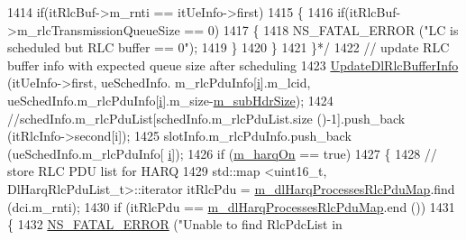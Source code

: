 \begin{DoxyCode}
1414 \textcolor{comment}{                                        if(itRlcBuf->m\_rnti == itUeInfo->first)}
1415 \textcolor{comment}{                                        \{}
1416 \textcolor{comment}{                                                if(itRlcBuf->m\_rlcTransmissionQueueSize == 0)}
1417 \textcolor{comment}{                                                \{}
1418 \textcolor{comment}{                                                        NS\_FATAL\_ERROR ("LC is scheduled but RLC buffer ==
       0");}
1419 \textcolor{comment}{                                                \}}
1420 \textcolor{comment}{                                        \}}
1421 \textcolor{comment}{                                \}*/}
1422                                 \textcolor{comment}{// update RLC buffer info with expected queue size after scheduling}
1423                                 \hyperlink{classns3_1_1MmWaveFlexTtiMacScheduler_a596a7a467d1cc60189f6123833df8df8}{UpdateDlRlcBufferInfo} (itUeInfo->first, ueSchedInfo.
      m\_rlcPduInfo[\hyperlink{bernuolliDistribution_8m_a6f6ccfcf58b31cb6412107d9d5281426}{i}].m\_lcid, ueSchedInfo.m\_rlcPduInfo[\hyperlink{bernuolliDistribution_8m_a6f6ccfcf58b31cb6412107d9d5281426}{i}].m\_size-\hyperlink{classns3_1_1MmWaveFlexTtiMacScheduler_ac2c5c229b7350214b5ff56c2a9167020}{m\_subHdrSize});
1424                                 \textcolor{comment}{//schedInfo.m\_rlcPduList[schedInfo.m\_rlcPduList.size ()-1].push\_back
       (itRlcInfo->second[i]);}
1425                                 slotInfo.m\_rlcPduInfo.push\_back (ueSchedInfo.m\_rlcPduInfo[
      \hyperlink{bernuolliDistribution_8m_a6f6ccfcf58b31cb6412107d9d5281426}{i}]);
1426                                 \textcolor{keywordflow}{if} (\hyperlink{classns3_1_1MmWaveFlexTtiMacScheduler_a832729b006315bb770e9f50c16305118}{m\_harqOn} == \textcolor{keyword}{true})
1427                                 \{
1428                                         \textcolor{comment}{// store RLC PDU list for HARQ}
1429                                         std::map <uint16\_t, DlHarqRlcPduList\_t>::iterator itRlcPdu =  
      \hyperlink{classns3_1_1MmWaveFlexTtiMacScheduler_a7b37cf0428128dbfe578cd3c5d3ffbe9}{m\_dlHarqProcessesRlcPduMap}.find (dci.m\_rnti);
1430                                         \textcolor{keywordflow}{if} (itRlcPdu == 
      \hyperlink{classns3_1_1MmWaveFlexTtiMacScheduler_a7b37cf0428128dbfe578cd3c5d3ffbe9}{m\_dlHarqProcessesRlcPduMap}.end ())
1431                                         \{
1432                                                 \hyperlink{group__fatal_ga5131d5e3f75d7d4cbfd706ac456fdc85}{NS\_FATAL\_ERROR} (\textcolor{stringliteral}{"Unable to find RlcPdcList in
}
\end{DoxyCode}

